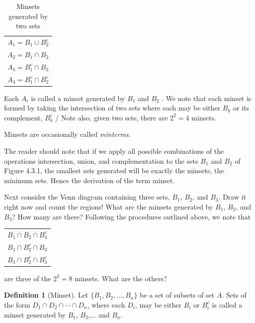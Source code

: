 \documentclass[10pt,]{book}
\theoremstyle{plain}
\theoremstyle{definition}
\newtheorem{definition}[theorem]{Definition}
\theoremstyle{definition}
\theoremstyle{definition}
\begin{document}
\leavevmode%
\begin{table}
\centering
\begin{tabular}{c}
\(A_1=B_1\cup B_2^c\)\tabularnewline[0pt]
\(A_2=B_1\cap B_2\)\tabularnewline[0pt]
\(A_3= B_1^c\cap B_2\)\tabularnewline[0pt]
\(A_4= B_1^c\cap B_2^c\)
\end{tabular}
\caption{Minsets generated by two sets\label{tab-minsets-2}}
\end{table}
\par
Each \(A_i\) is called a minset generated by \(B_1\) and \(B_2\) . We note that each minset is formed by taking the intersection of two sets where each may be either \(B_k\) or its complement, \(B_k^c\) / Note also, given two sets, there are \(2^{2}=4\) minsets.%
\par
Minsets are occasionally called \emph{minterms}.%
\par
The reader should note that if we apply all possible combinations of the operations intersection, union, and complementation to the sets \(B_1\) and \(B_2\) of Figure 4.3.1, the smallest sets generated will be exactly the minsets, the minimum sets. Hence the derivation of the term minset.%
\par
Next consider the Venn diagram containing three sets, \(B_1\), \(B_2\), and \(B_3\). Draw it right now and count the regions! 
What are the minsets generated by \(B_1\), \(B_2\), and \(B_3\)? How many are there? Following the procedures outlined above, we note that%
\leavevmode%
\begin{table}
\centering
\begin{tabular}{c}
\(B_1\cap B_2\cap B_3^c\)\tabularnewline[0pt]
\(B_1\cap B_2^c\cap B_3\)\tabularnewline[0pt]
\(B_1\cap B_2^c\cap B_3^c\)
\end{tabular}
\end{table}
\par
are three of the \(2^3=8\) minsets. What are the others?%
\begin{definition}[Minset]\label{def-Minset}
Let \(\{B_1, B_2,\ldots,B_n\}\) be a set of subsets of  set \(A\). Sets of the form \(D_1\cap D_2\cap
\cdots \cap D_n\), where each \(D_i\), may be either \(B_i\) or \(B_i^c\) is called a minset generated by \(B_1\), \(B_2\),... and  \(B_n\).%
\end{definition}
\end{document}
